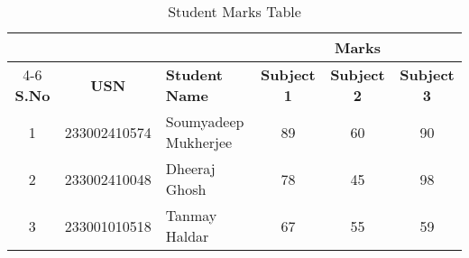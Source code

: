 \documentclass{article}
\begin{document}
\begin{table}[h!]
\centering
\begin{tabular}{|c|c|p{2.5cm}|c|c|c|}
\hline
\multirow{2}{*}{} & \multirow{2}{*}{} & \multirow{2}{*}{} & \multicolumn{3}{c|}{\textbf{Marks}} \\ \cline{4-6}
\textbf{S.No} & \textbf{USN} & \textbf{Student Name} & \textbf{Subject 1} & \textbf{Subject 2} & \textbf{Subject 3} \\ \hline
1 & 233002410574 & Soumyadeep Mukherjee & 89 & 60 & 90 \\ \hline
2 & 233002410048 & Dheeraj Ghosh  & 78 & 45 & 98 \\ \hline
3 & 233001010518 & Tanmay Haldar  & 67 & 55 & 59 \\ \hline
\end{tabular}
\caption{Student Marks Table}
\label{table:marks}
\end{table}
\end{document}
